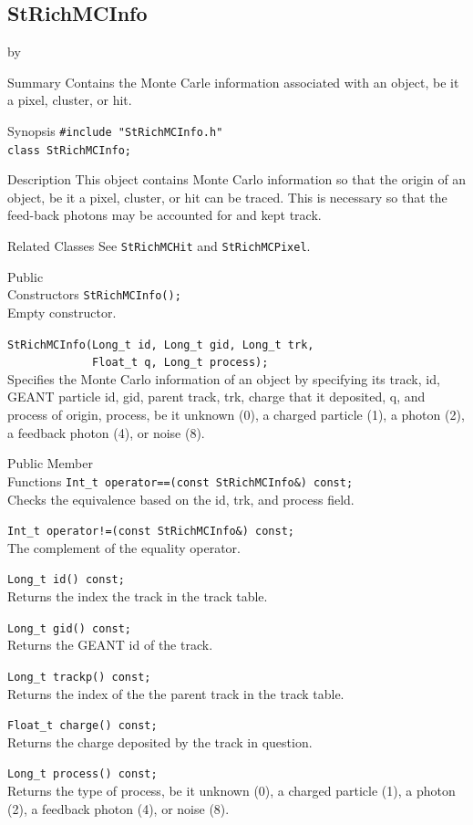 \documentclass[twoside]{article}
\newcommand{\entrylabel}[1]{\mbox{\textbf{{#1}}}\hfil}%
\newenvironment{entry}
{\begin{list}{}%
    {\renewcommand{\makelabel}{\entrylabel}%
     \setlength{\labelwidth}{90pt}%
     \setlength{\leftmargin}{\labelwidth}
     \advance\leftmargin by \labelsep%
      }%
    }%
  {\end{list}}
\newcommand{\Entrylabel}[1]%
{\raisebox{0pt}[1ex][0pt]{\makebox[\labelwidth][l]%
    {\parbox[t]{\labelwidth}{\hspace{0pt}\textbf{{#1}}}}}}
\newenvironment{Entry}%
{\renewcommand{\entrylabel}{\Entrylabel}\begin{entry}}%
  {\end{entry}}
\begin{document}
\subsection{StRichMCInfo}
\label{sec:StRichMCInfo}
\begin{Entry}
\item[Summary] Contains the Monte Carle information associated with
    an object, be it a pixel, cluster, or hit.
\item[Synopsis]
    \verb+#include "StRichMCInfo.h"+\\
    \verb+class StRichMCInfo;+\\
\item[Description] This object contains Monte Carlo information
    so that the origin of an object, be it a pixel, cluster, or
    hit can be traced.  This is necessary so that the feed-back
    photons may be accounted for and kept track.
\item[Related Classes]
    See \texttt{StRichMCHit} and \texttt{StRichMCPixel}.
\item[Public\\ Constructors]
    \verb+StRichMCInfo();+\\
    Empty constructor.

    \verb+StRichMCInfo(Long_t id, Long_t gid, Long_t trk,+\\
    \verb+             Float_t q, Long_t process);+\\
    Specifies the Monte Carlo information of an object by specifying
    its track, id, GEANT particle id, gid, parent track, trk,
    charge that it deposited, q, and process of origin, process, be it
    unknown (0), a charged particle (1), a photon (2), a feedback
    photon (4), or noise (8).
\item[Public Member\\ Functions]
    \verb+Int_t operator==(const StRichMCInfo&) const;+\\
    Checks the equivalence based on the id, trk, and process
    field.

    \verb+Int_t operator!=(const StRichMCInfo&) const;+\\
    The complement of the equality operator.

    \verb+Long_t id() const;+\\
    Returns the index the track in the track table.

    \verb+Long_t gid() const;+\\
    Returns the GEANT id of the track.

    \verb+Long_t trackp() const;+\\
    Returns the index of the the parent track in
    the track table.

    \verb+Float_t charge() const;+\\
    Returns the charge deposited by the track in question.

    \verb+Long_t process() const;+\\
    Returns the type of process, be it unknown (0), a charged
    particle (1), a photon (2), a feedback photon (4), or
    noise (8).

\end{Entry}
\clearpage
\end{document}

